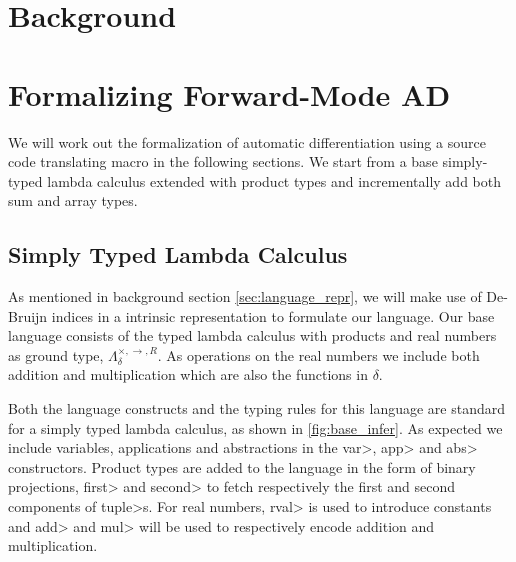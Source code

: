 \documentclass[11pt, final]{article}
\begin{document}

\newpage


\newpage

\setcounter{page}{3}
\tableofcontents
\newpage



\section{Background}






\section{Formalizing Forward-Mode AD}
  We will work out the formalization of automatic differentiation using a source code translating macro in the following sections.
  We start from a base simply-typed lambda calculus extended with product types and incrementally add both sum and array types.

  \subsection{Simply Typed Lambda Calculus}
  As mentioned in background section \ref{sec:language_repr}, we will make use of De-Bruijn indices in a intrinsic representation to formulate our language.
  Our base language consists of the typed lambda calculus with products and real numbers as ground type, $\Lambda_{\delta}^{\times, \rightarrow, R}$.
  As operations on the real numbers we include both addition and multiplication which are also the functions in $\delta$.

  Both the language constructs and the typing rules for this language are standard for a simply typed lambda calculus, as shown in \ref{fig:base_infer}.
  As expected we include variables, applications and abstractions in the \<var>, \<app> and \<abs> constructors.
  Product types are added to the language in the form of binary projections, \<first> and \<second> to fetch respectively the first and second components of \<tuple>s.
  For real numbers, \<rval> is used to introduce constants and \<add> and \<mul> will be used to respectively encode addition and multiplication.
\end{document}
